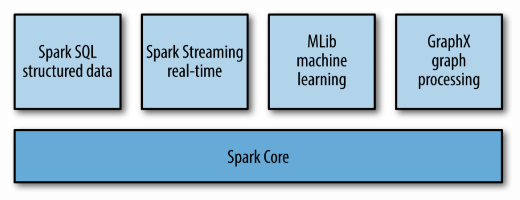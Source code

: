 \begin{frame}
    \centerline{\includegraphics[width=0.7\linewidth]{spark-libraries.png}}
\end{frame}

